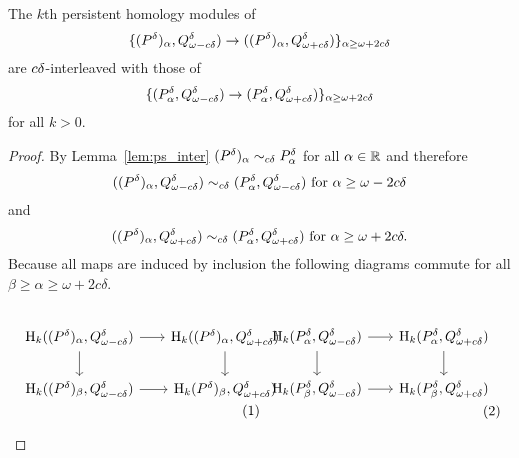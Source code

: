 \begin{lemma}
  The $k$th persistent homology modules of
  \[ \{(P^{{\delta}})_\alpha, Q_{\omega - c{\delta}}^\delta)\to ((P^{{\delta}})_\alpha, Q_{\omega + c{\delta}}^\delta)\}_{\alpha\geq\omega+2c{\delta}} \]
  are $c{\delta}$-interleaved with those of
  \[ \{(P^{{\delta}}_\alpha, Q_{\omega - c{\delta}}^\delta)\to (P^{{\delta}}_\alpha,Q_{\omega + c{\delta}}^\delta)\}_{\alpha\geq \omega+2c{\delta}} \]
  for all $k > 0$.
\end{lemma}
\begin{proof}
  By Lemma~\ref{lem:ps_inter} $(P^{{\delta}})_\alpha\sim_{c{\delta}} P^{{\delta}}_\alpha$ for all $\alpha\in\mathbb{R}$ and therefore
  \[ ((P^{{\delta}})_\alpha, Q_{\omega - c{\delta}}^\delta)\sim_{c{\delta}} (P^{{\delta}}_\alpha, Q_{\omega - c{\delta}}^\delta)\text{ for } \alpha \geq \omega - 2c{\delta}\]
  and
  \[ ((P^{{\delta}})_\alpha, Q_{\omega + c{\delta}}^\delta)\sim_{c{\delta}} (P^{{\delta}}_\alpha, Q_{\omega + c{\delta}}^\delta)\text{ for }\alpha \geq \omega + 2c\delta.\]
  Because all maps are induced by inclusion the following diagrams commute for all $\beta\geq\alpha\geq\omega+2c\delta$.

  \begin{scriptsize}
  \vspace{3ex}\begin{subequations}
  \begin{minipage}{0.5\textwidth}\begin{equation}\label{dgm:fab}
  \begin{tikzcd}[column sep=scriptsize]
    \hom_k((\P)_\alpha, \Q^\delta)\arrow{r} \arrow{d} &
    \hom_k((\P)_\alpha, \QQ^\delta)\arrow{d} \\
    \hom_k((\P)_\beta, \Q^\delta)\arrow{r} &
    \hom_k(\P)_\beta, \QQ^\delta)
  \end{tikzcd}\end{equation}\end{minipage}
  \begin{minipage}{0.5\textwidth}\begin{equation}\label{dgm:gcd}
  \begin{tikzcd}[column sep=scriptsize]
    \hom_k(\P_\alpha, \Q^\of)\arrow{r} \arrow{d} &
    \hom_k(\P_\alpha, \QQ^\of)\arrow{d} \\
    \hom_k(\P_\beta, \Q^\of)\arrow{r} &
    \hom_k(\P_\beta, \QQ^\of)
  \end{tikzcd}\end{equation}\end{minipage}
  \end{subequations}\vspace{3ex}


\end{scriptsize}
\end{proof}
